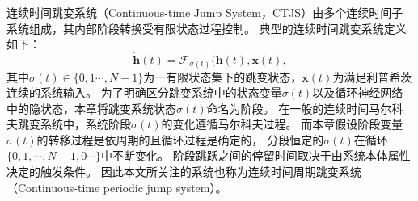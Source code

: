 连续时间跳变系统（Continuous-time Jump System，CTJS）由多个连续时间子系统组成，其内部阶段转换受有限状态过程控制\cite{8709809}。
典型的连续时间跳变系统定义如下：
\begin{equation}
    \dot{\boldsymbol h}(t)=\mathcal{F}_{\sigma(t)}(\boldsymbol h(t), \boldsymbol x(t),
    \label{equ:ctjls}
\end{equation}
其中$\sigma(t)\in\{0,1\cdots,N-1\}$为一有限状态集下的跳变状态，$\boldsymbol{x}(t)$为满足利普希茨连续的系统输入。
为了明确区分跳变系统中的状态变量$\sigma(t)$以及循环神经网络中的隐状态，本章将跳变系统状态$\sigma(t)$命名为阶段。
在一般的连续时间马尔科夫跳变系统中，系统阶段$\sigma(t)$的变化遵循马尔科夫过程。
而本章假设阶段变量$\sigma(t)$的转移过程是依周期的且循环过程是确定的，
分段恒定的$\sigma(t)$在循环$\{0,1,\cdots,N-1,0 \cdots\}$中不断变化。
阶段跳跃之间的停留时间取决于由系统本体属性决定的触发条件。
因此本文所关注的系统也称为连续时间周期跳变系统（Continuous-time periodic jump system）。

